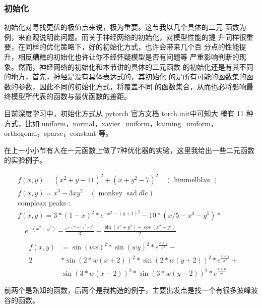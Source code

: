 \documentclass[UTF8]{ctexart}
\begin{document}
\subsubsection{初始化}

初始化对寻找更优的极值点来说，极为重要。这节我以几个具体的二元
函数为例，来直观说明此问题。而关于神经网络的初始化，对模型性能的提
升同样很重要，在同样的优化策略下，好的初始化方式，也许会带来几个百
分点的性能提升，相反糟糕的初始化也许让你不经怀疑模型是否有问题等
严重影响判断的现象。然而，神经网络的初始化和本节讲的具体的二元函数
的初始化还是有其不同的地方，首先，神经是没有具体表达式的，其初始化
的是所有可能的函数集的函数的参数，因此不同的初始化方式，将覆盖不同
的函数集合，从而也必将影响最终模型所代表的函数与最优函数的差距。

目前深度学习中，初始化方式从 pytorch 官方文档 torch.init中可知大
概有 11 种方式，比如 uniform，normal，xavier\_uniform，kaiming\_uniform，
orthogonal，sparse，constant 等。

在上一小小节有人在一元函数上做了7种优化器的实验，这里我给出一些二元函数的实验例子。

$$
\begin{array}{l}
	f(x, y)=\left(x^{2}+y-11\right)^{2}+\left(x+y^{2}-7\right)^{2} \quad(\text { himmelblau }) \\
	f(x, y)=x^{3}-3 x y^{2} \quad(\text { monkey } \operatorname{sad} d l e) \\
	\text {compleax peaks :}\\
	f(x, y)=3 *(1-x)^{2} * e^{-x^{2}-(y+1)^{2}}-10 *\left(x / 5-x^{3}-y^{5}\right) * \\
	\quad e^{-\left(x^{2}+y^{2}\right)}-\frac{e^{-(x+1)^{2}-y^{2}}}{3}-\frac{\sin 
	\left(x^{2}+y^{2}\right)-\cos \left(x^{2}+y^{2}\right)}{2} \\
	\begin{aligned}
		
		&\begin{aligned}
		f(x, y) &=\sin (w x)^{2} * \sin (w y)^{2} * e^{\frac{x+y}{\sigma^{2}}}-\\
		2 & * \sin (2 * w(x+2))^{2} * \sin (2 * w(y+2))^{2} * e^{\frac{x+y}{\sigma^{2}}}+\\
		& \sin (3 * w(x-2))^{2} * \sin (3 * w(y-2))^{2} * e^{\frac{x+y}{\sigma^{2}}}
		\end{aligned}\\
		\end{aligned}
	\end{array}
$$
前两个是熟知的函数，后两个是我构造的例子，主要出发点是找一个有很多波峰波谷的函数。
\end{document}

